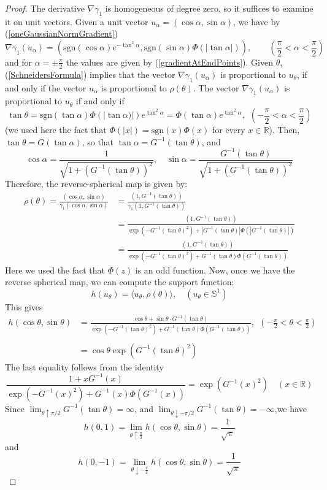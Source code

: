 \documentclass{article}[1100]
\theoremstyle{definition}
\theoremstyle{remark}
\newcommand\sgn{\text{sgn}}
\newcommand\innerproduct[2]{\langle #1,#2\rangle}
\newcommand\ar{\mathbb{R}}
\begin{document}
\begin{proof}
The derivative $\nabla\gamma_1$ is homogeneous of degree zero, so it suffices to examine it on unit vectors.
Given a unit vector $u_\alpha=(\cos\alpha,\sin\alpha)$, we have by (\ref{oneGaussianNormGradient})
\[\nabla\gamma_1(u_\alpha)=(\sgn(\cos\alpha)e^{-\tan^2\alpha},\sgn(\sin\alpha)\Phi(|\tan\alpha|)),\qquad (\frac{\pi}{2}<\alpha<\frac{\pi}{2}) \]
and for $\alpha=\pm\frac{\pi}{2}$ the values are given by (\ref{gradientAtEndPoints}). 
Given $\theta$,  (\ref{SchneidersFormula}) implies that the vector $\nabla\gamma_1(u_\alpha)$ is proportional to $u_\theta$, if and only if 
the vector $u_\alpha$ is proportional to $\rho(\theta)$.
The vector $\nabla\gamma_1(u_\alpha)$ is proportional to $u_\theta$ if and only if 
\[\tan\theta=\sgn({\tan\alpha})\Phi(|\tan\alpha)|)e^{\tan^2\alpha}=\Phi(\tan\alpha)e^{\tan^2\alpha},\ \ (-\frac{\pi}{2}< \alpha <\frac{\pi}{2})\]
(we used here the fact that $\Phi(|x|)=\sgn(x)\Phi(x)$ for every $x\in\mathbb{R}$). 
 Then, $\tan\theta=G(\tan\alpha)$, so that $\tan\alpha=G^{-1}(\tan\theta)$, and 
\[ \cos\alpha=\frac{1}{\sqrt{1+(G^{-1}(\tan\theta))^2}},\quad\sin\alpha=\frac{G^{-1}(\tan\theta)}{\sqrt{1+(G^{-1}(\tan\theta))^2}}\]
Therefore, the reverse-spherical map is given by:
\[
\begin{aligned}
\rho(\theta)=\frac{(\cos\alpha,\sin\alpha)}{\gamma_1(\cos\alpha,\sin\alpha)}&=\frac{(1,G^{-1}(\tan\theta))}{\gamma_1(1,G^{-1}(\tan\theta))}\\
&=\frac{(1,G^{-1}(\tan\theta))}{\exp(-G^{-1}(\tan\theta)^2)+|G^{-1}(\tan\theta)|\Phi(|G^{-1}(\tan\theta)|)}\\
&=\frac{(1,G^{-1}(\tan\theta))}{\exp(-G^{-1}(\tan\theta)^2)+G^{-1}(\tan\theta)\Phi(G^{-1}(\tan\theta))}
\end{aligned}
\]
Here we used the fact that $\Phi(z)$ is an odd function. Now, once we have the reverse spherical map, we can compute the support function:
\[ h(u_\theta)=\innerproduct{u_\theta}{\rho(\theta)},\quad (u_\theta\in\mathbb{S}^1)
\]
This gives
\[
\begin{aligned}
h(\cos\theta,\sin\theta)&=\frac{\cos\theta+\sin\theta\cdot G^{-1}(\tan\theta)}{\exp(-G^{-1}(\tan\theta)^2)+G^{-1}(\tan\theta)\Phi(G^{-1}(\tan\theta))},\ \ (-\frac{\pi}{2} < \theta < \frac{\pi}{2})\\
\\
&=\cos\theta\exp(G^{-1}(\tan\theta)^2)
\end{aligned}
\]
The last equality follows from the identity
\[ \frac{1+xG^{-1}(x)}{\exp(-G^{-1}(x)^2)+G^{-1}(x)\Phi(G^{-1}(x))}=\exp(G^{-1}(x)^2)\quad (x\in\ar) \]
Since $\lim_{\theta\uparrow\pi/2}G^{-1}(\tan\theta)=\infty$, and  $\lim_{\theta\downarrow -\pi/2}G^{-1}(\tan\theta)=-\infty$,we have
\[ h(0,1)=\lim_{\theta\uparrow\frac{\pi}{2}}h(\cos\theta,\sin\theta)=\frac{1}{\sqrt{\pi}}\]
and
\[ h(0,-1)=\lim_{\theta\downarrow -\frac{\pi}{2}}h(\cos\theta,\sin\theta)=\frac{1}{\sqrt{\pi}}\]
\end{proof}
\end{document}
